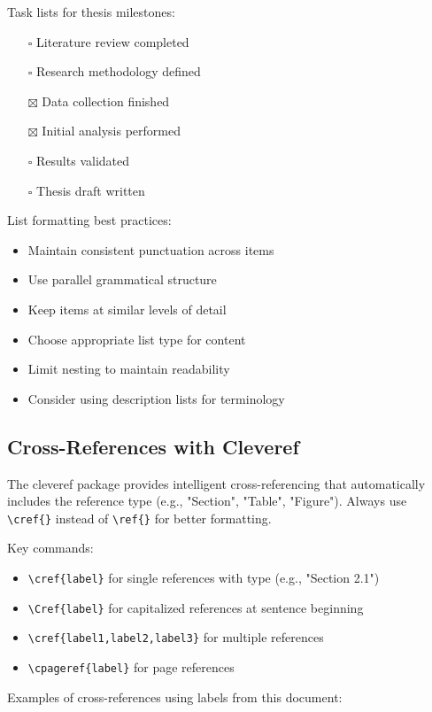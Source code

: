 Task lists for thesis milestones:

\begin{itemize}
    \item[$\square$] Literature review completed
    \item[$\square$] Research methodology defined
    \item[$\boxtimes$] Data collection finished
    \item[$\boxtimes$] Initial analysis performed
    \item[$\square$] Results validated
    \item[$\square$] Thesis draft written
\end{itemize}

List formatting best practices:
\begin{itemize}
    \item Maintain consistent punctuation across items
    \item Use parallel grammatical structure
    \item Keep items at similar levels of detail
    \item Choose appropriate list type for content
    \item Limit nesting to maintain readability
    \item Consider using description lists for terminology
\end{itemize}

\subsection{Cross-References with Cleveref}

The cleveref package provides intelligent cross-referencing that automatically includes the reference type (e.g., "Section", "Table", "Figure"). Always use \verb+\cref{}+ instead of \verb+\ref{}+ for better formatting.

Key commands:
\begin{itemize}
    \item \verb+\cref{label}+ for single references with type (e.g., "Section 2.1")
    \item \verb+\Cref{label}+ for capitalized references at sentence beginning
    \item \verb+\cref{label1,label2,label3}+ for multiple references
    \item \verb+\cpageref{label}+ for page references
\end{itemize}

Examples of cross-references using labels from this document:

